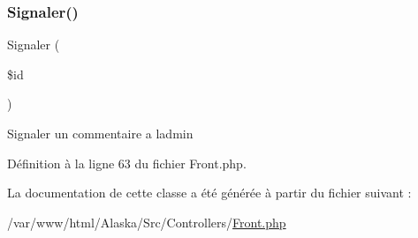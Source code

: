 \subsubsection{\texorpdfstring{Signaler()}{Signaler()}}
{\footnotesize\ttfamily Signaler (\begin{DoxyParamCaption}\item[{}]{\$id }\end{DoxyParamCaption})}

Signaler un commentaire a l\textquotesingle{}admin 

Définition à la ligne 63 du fichier Front.\+php.



La documentation de cette classe a été générée à partir du fichier suivant \+:\begin{DoxyCompactItemize}
\item 
/var/www/html/\+Alaska/\+Src/\+Controllers/\hyperlink{_front_8php}{Front.\+php}\end{DoxyCompactItemize}
